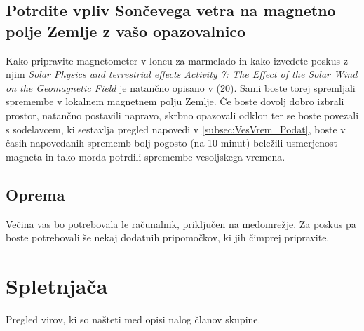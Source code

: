 \subsection{Potrdite vpliv Sončevega vetra na magnetno polje Zemlje z vašo opazovalnico}
\label{subsec:VesVrem_Posk}
Kako pripravite magnetometer v loncu za marmelado in kako izvedete poskus z njim \textit{Solar Physics and terrestrial effects Activity 7: The Effect of the Solar Wind on the Geomagnetic Field} je natančno opisano v (20). Sami boste torej spremljali spremembe v lokalnem magnetnem polju Zemlje. Če boste dovolj dobro izbrali prostor, natančno postavili napravo, skrbno opazovali odklon ter se boste povezali s sodelavcem, ki sestavlja pregled napovedi v \ref{subsec:VesVrem_Podat}, boste v časih napovedanih sprememb bolj pogosto (na 10 minut) beležili usmerjenost magneta in tako morda potrdili spremembe vesoljskega vremena.


\subsection{Oprema}
\label{subsec:VesVrem_Oprema}
Večina vas bo potrebovala le računalnik, priključen na medomrežje. Za poskus pa boste potrebovali še nekaj dodatnih pripomočkov, ki jih čimprej pripravite.

\section{Spletnjača}
\label{sec:VesVrem_Splet}

Pregled virov, ki so našteti med opisi nalog članov skupine.


